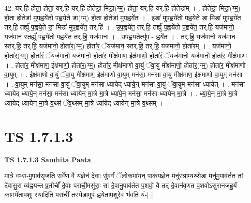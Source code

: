 \documentclass[17pt]{extarticle}
\begin{document}
42. यर्.हि॒ होता॒ होता॒ यर्.हि॒ यर्.हि॒ होतेडा॒ मिडा॒(ग्म्॒) होता॒ यर्.हि॒ यर्.हि॒ होतेडा᳚म् । . होतेडा॒ मिडा॒(ग्म्॒) होता॒ होतेडा॑ मुप॒ह्वये॑तो प॒ह्वये॒ते डा॒(ग्म्॒) होता॒ होतेडा॑ मुप॒ह्वये॑त । . इडा॑ मुप॒ह्वये॑तो प॒ह्वये॒ते डा॒ मिडा॑ मुप॒ह्वये॑त॒ तर्.हि॒ तर्ह्यु॑ प॒ह्वये॒ते डा॒ मिडा॑ मुप॒ह्वये॑त॒ तर्.हि॑ । . उ॒प॒ह्वये॑त॒ तर्.हि॒ तर्ह्यु॑ प॒ह्वये॑तो प॒ह्वये॑त॒ तर्.हि॒ यज॑मानो॒ यज॑मान॒ स्तर्ह्यु॑ प॒ह्वये॑तो प॒ह्वये॑त॒ तर्.हि॒ यज॑मानः । . उ॒प॒ह्वय॒तेत्यु॑प - ह्वये॑त । . तर्.हि॒ यज॑मानो॒ यज॑मान॒ स्तर्.हि॒ तर्.हि॒ यज॑मानो॒ होता॑र॒(ग्म्॒) होता॑रं॒ ॅयज॑मान॒ स्तर्.हि॒ तर्.हि॒ यज॑मानो॒ होता॑रम् । . यज॑मानो॒ होता॑र॒(ग्म्॒) होता॑रं॒ ॅयज॑मानो॒ यज॑मानो॒ होता॑र॒ मीक्ष॑माण॒ ईक्ष॑माणो॒ होता॑रं॒ ॅयज॑मानो॒ यज॑मानो॒ होता॑र॒ मीक्ष॑माणः । . होता॑र॒ मीक्ष॑माण॒ ईक्ष॑माणो॒ होता॑र॒(ग्म्॒) होता॑र॒ मीक्ष॑माणो वा॒युं ॅवा॒यु मीक्ष॑माणो॒ होता॑र॒(ग्म्॒) होता॑र॒ मीक्ष॑माणो वा॒युम् । . ईक्ष॑माणो वा॒युं ॅवा॒यु मीक्ष॑माण॒ ईक्ष॑माणो वा॒युम् मन॑सा॒ मन॑सा वा॒यु मीक्ष॑माण॒ ईक्ष॑माणो वा॒युम् मन॑सा । . वा॒युम् मन॑सा॒ मन॑सा वा॒युं ॅवा॒युम् मन॑सा ध्यायेद् ध्याये॒न् मन॑सा वा॒युं ॅवा॒युम् मन॑सा ध्यायेत् । . मन॑सा ध्यायेद् ध्याये॒न् मन॑सा॒ मन॑सा ध्यायेन् मा॒त्रे मा॒त्रे ध्या॑ये॒न् मन॑सा॒ मन॑सा ध्यायेन् मा॒त्रे । . ध्या॒ये॒न् मा॒त्रे मा॒त्रे ध्या॑येद् ध्यायेन् मा॒त्रे व॒थ्सं ॅव॒थ्सम् मा॒त्रे ध्या॑येद् ध्यायेन् मा॒त्रे व॒थ्सम् । \newline
\pagebreak
{}

\section{ TS 1.7.1.3 }

\textbf{TS 1.7.1.3 } \newline
\textbf{Samhita Paata} \newline

मा॒त्रे व॒थ्स-मु॒पाव॑सृजति॒ सर्वे॑ण॒ वै य॒ज्ञेन॑ दे॒वाः सु॑व॒र्गं ॅलो॒कमा॑यन् पाकय॒ज्ञेन॒ मनु॑रश्राम्य॒थ्सेडा॒ मनु॑मु॒पाव॑र्तत॒ तां दे॑वासु॒रा व्य॑ह्वयन्त प्र॒तीचीं᳚ दे॒वाः परा॑ची॒मसु॑राः॒ सा दे॒वानु॒पाव॑र्तत प॒शवो॒ वै तद् दे॒वान॑वृणत प॒शवोऽसु॑रानजहु॒र्यं का॒मये॑ताप॒शुः स्या॒दिति॒ परा॑चीं॒ तस्येडा॒मुप॑ ह्वयेताप॒शुरे॒व भ॑वति॒ यं-[ ] \newline
\end{document}
